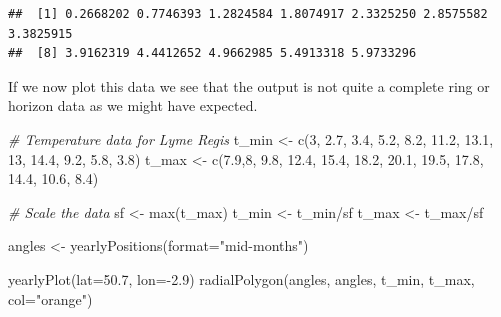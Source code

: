 \documentclass[
]{book}
\newenvironment{Shaded}{\begin{snugshade}}{\end{snugshade}}
\newcommand{\AttributeTok}[1]{\textcolor[rgb]{0.77,0.63,0.00}{#1}}
\newcommand{\CommentTok}[1]{\textcolor[rgb]{0.56,0.35,0.01}{\textit{#1}}}
\newcommand{\DecValTok}[1]{\textcolor[rgb]{0.00,0.00,0.81}{#1}}
\newcommand{\FloatTok}[1]{\textcolor[rgb]{0.00,0.00,0.81}{#1}}
\newcommand{\FunctionTok}[1]{\textcolor[rgb]{0.00,0.00,0.00}{#1}}
\newcommand{\NormalTok}[1]{#1}
\newcommand{\OtherTok}[1]{\textcolor[rgb]{0.56,0.35,0.01}{#1}}
\newcommand{\SpecialCharTok}[1]{\textcolor[rgb]{0.00,0.00,0.00}{#1}}
\newcommand{\StringTok}[1]{\textcolor[rgb]{0.31,0.60,0.02}{#1}}
\begin{document}
\begin{verbatim}
##  [1] 0.2668202 0.7746393 1.2824584 1.8074917 2.3325250 2.8575582 3.3825915
##  [8] 3.9162319 4.4412652 4.9662985 5.4913318 5.9733296
\end{verbatim}

If we now plot this data we see that the output is not quite a complete ring or horizon data as we might have expected.

\begin{Shaded}
\begin{Highlighting}[]
\CommentTok{\# Temperature data for Lyme Regis}
\NormalTok{t\_min }\OtherTok{\textless{}{-}} \FunctionTok{c}\NormalTok{(}\DecValTok{3}\NormalTok{, }\FloatTok{2.7}\NormalTok{, }\FloatTok{3.4}\NormalTok{, }\FloatTok{5.2}\NormalTok{, }\FloatTok{8.2}\NormalTok{, }\FloatTok{11.2}\NormalTok{, }\FloatTok{13.1}\NormalTok{, }\DecValTok{13}\NormalTok{, }\FloatTok{14.4}\NormalTok{, }\FloatTok{9.2}\NormalTok{, }\FloatTok{5.8}\NormalTok{, }\FloatTok{3.8}\NormalTok{)}
\NormalTok{t\_max }\OtherTok{\textless{}{-}} \FunctionTok{c}\NormalTok{(}\FloatTok{7.9}\NormalTok{,}\DecValTok{8}\NormalTok{, }\FloatTok{9.8}\NormalTok{, }\FloatTok{12.4}\NormalTok{, }\FloatTok{15.4}\NormalTok{, }\FloatTok{18.2}\NormalTok{, }\FloatTok{20.1}\NormalTok{, }\FloatTok{19.5}\NormalTok{, }\FloatTok{17.8}\NormalTok{, }\FloatTok{14.4}\NormalTok{, }\FloatTok{10.6}\NormalTok{, }\FloatTok{8.4}\NormalTok{)}

\CommentTok{\# Scale the data}
\NormalTok{sf }\OtherTok{\textless{}{-}} \FunctionTok{max}\NormalTok{(t\_max)}
\NormalTok{t\_min }\OtherTok{\textless{}{-}}\NormalTok{ t\_min}\SpecialCharTok{/}\NormalTok{sf}
\NormalTok{t\_max }\OtherTok{\textless{}{-}}\NormalTok{ t\_max}\SpecialCharTok{/}\NormalTok{sf}

\NormalTok{angles }\OtherTok{\textless{}{-}} \FunctionTok{yearlyPositions}\NormalTok{(}\AttributeTok{format=}\StringTok{"mid{-}months"}\NormalTok{)}

\FunctionTok{yearlyPlot}\NormalTok{(}\AttributeTok{lat=}\FloatTok{50.7}\NormalTok{, }\AttributeTok{lon=}\SpecialCharTok{{-}}\FloatTok{2.9}\NormalTok{)}
\FunctionTok{radialPolygon}\NormalTok{(angles, angles, t\_min, t\_max, }\AttributeTok{col=}\StringTok{"orange"}\NormalTok{)}
\end{Highlighting}
\end{Shaded}
\end{document}
